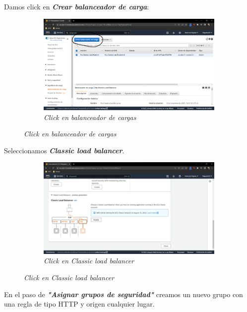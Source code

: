 Damos click en \textbf{\textit{Crear balanceador de carga}}:

\begin{figure}[H]
    \centering
    \begin{subfigure}[b]{0.8\textwidth}
        \centering
        \includegraphics[width=\textwidth]{Figures/0. General/load_balancer_6.png}
        \caption{\textit{Click en balanceador de cargas}}
        \label{fig: load balancer 6}
    \end{subfigure}
\end{figure}

Seleccionamos \textbf{\textit{Classic load balancer}}.

\begin{figure}[H]
    \centering
    \begin{subfigure}[b]{0.8\textwidth}
        \centering
        \includegraphics[width=\textwidth]{Figures/0. General/load_balancer_7.png}
        \caption{\textit{Click en Classic load balancer}}
        \label{fig: load balancer 7}
    \end{subfigure}
\end{figure}

En el paso de \textbf{\textit{"Asignar grupos de seguridad"}} creamos un nuevo
grupo con una regla de tipo HTTP y origen cualquier lugar.

